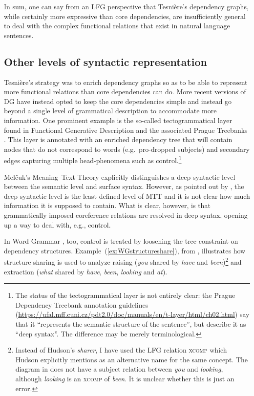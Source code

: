 \documentclass[output=paper,hidelinks]{langscibook}
\begin{document}
\hspace*{-4.3pt}In sum, one can say from an LFG perspective that Tesnière's dependency
graphs, while certainly more expressive than core dependencies, are
insufficiently general to deal with the complex functional relations
that exist in natural language sentences.

\subsection{Other levels of syntactic representation}\label{subsec:morelevels}
Tesnière's strategy was to enrich dependency graphs so as to be able
to represent more functional relations than core dependencies can do.
More recent versions of DG have instead opted to keep the core
dependencies simple and instead go beyond a single level of
grammatical description to accommodate more information. One prominent
example is the so-called tectogrammatical layer found in Functional
Generative Description \citep{SgallEtAl1986} and the associated Prague Treebanks \citep{HajicEtAl2020}. This layer
is annotated with an enriched dependency tree that will contain nodes
that do not correspond to words (e.g.\ pro-dropped subjects) and
secondary edges capturing multiple head-phenomena such as
control.\footnote{The status of the tectogrammatical layer is not
  entirely clear: the Prague Dependency Treebank annotation guidelines
  (\url{https://ufal.mff.cuni.cz/pdt2.0/doc/manuals/en/t-layer/html/ch02.html})
  say that it ``represents the semantic structure of the sentence'',
  but \citet{HajicEtAl2020} describe it as ``deep
  syntax''. The difference may be merely terminological.}

Mel\v{c}uk's Meaning--Text Theory explicitly distinguishes a
deep syntactic level between the semantic level and surface
syntax. However, as pointed out by \citet{Kahane2003}, the deep
syntactic level is the least defined level of MTT and it is not clear
how much information it is supposed to contain. What is clear,
however, is that grammatically imposed coreference relations are
resolved in deep syntax, opening up a way to deal with, e.g., control.

In Word Grammar \citep{Hudson84,Hudson2010}, too, control is treated by loosening the tree
constraint on dependency structures. Example~(\ref{ex:WGstructureshare}), from \citet[521]{Hudson2003}, illustrates how structure
sharing is used to analyze raising (\textit{you} shared by
\textit{have} and \textit{been})\footnote{Instead of Hudson's \textit{sharer}, I have used the LFG relation \textsc{xcomp} which Hudson explicitly mentions as an alternative name for the same concept. The diagram in \citet[521]{Hudson2003} does not have a
  subject relation between \textit{you} and \textit{looking}, although
  \textit{looking} is an \textsc{xcomp} of \textit{been}. It is
  unclear whether this is just an error.   } and extraction
(\textit{what} shared by \textit{have}, \textit{been},
\textit{looking} and \textit{at}).
\end{document}
